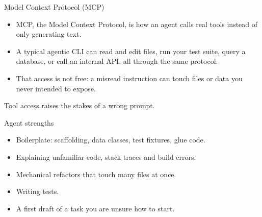 \documentclass[10pt,aspectratio=169,t]{beamer}
\begin{document}
\begin{frame}[eyebrow=Agents]{Model Context Protocol (MCP)}
  \vskip 2mm
  \begin{itemize}
    \item MCP, the Model Context Protocol, is how an agent calls real tools instead of only generating text.
    \item A typical agentic CLI can read and edit files, run your test suite, query a database, or call an internal API, all through the same protocol.
    \item That access is not free: a misread instruction can touch files or data you never intended to expose.
  \end{itemize}
  \begin{takeaway}{Tool access raises the stakes of a wrong prompt.}
  \end{takeaway}
\end{frame}

\begin{frame}[eyebrow=Agents]{Agent strengths}
  \vskip 2mm
  \begin{itemize}
    \item Boilerplate: scaffolding, data classes, test fixtures, glue code.
    \item Explaining unfamiliar code, stack traces and build errors.
    \item Mechanical refactors that touch many files at once.
    \item Writing tests.
    \item A first draft of a task you are unsure how to start.
  \end{itemize}
\end{frame}
\end{document}
